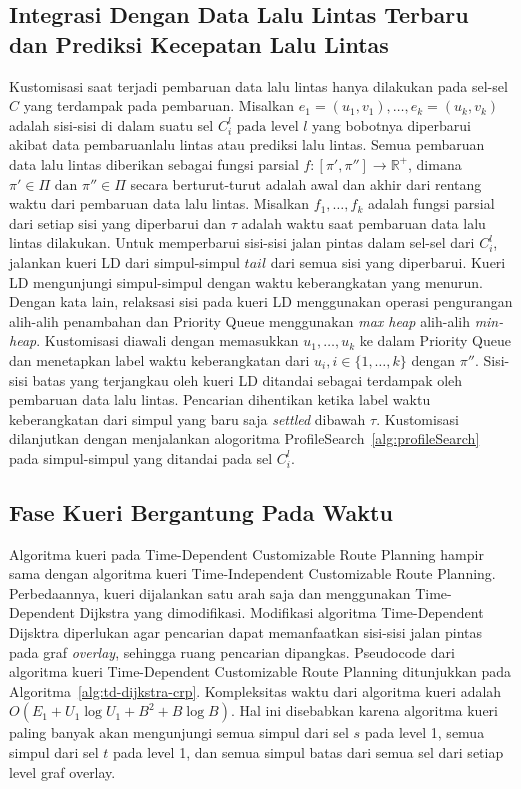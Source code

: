 \subsection{Integrasi Dengan Data Lalu Lintas Terbaru dan Prediksi Kecepatan Lalu Lintas}
\label{subsec:tdcrp-traffic-update}
Kustomisasi saat terjadi pembaruan data lalu lintas hanya dilakukan pada sel-sel $C$ yang terdampak pada pembaruan. Misalkan $e_1=(u_1,v_1),\ldots,e_k=(u_k,v_k)$ adalah sisi-sisi di dalam suatu sel $C_i^l \text{ pada level }l$ yang bobotnya diperbarui akibat data pembaruanlalu lintas atau prediksi lalu lintas. Semua pembaruan data lalu lintas diberikan sebagai fungsi parsial $f:[\pi',\pi'']\rightarrow \mathbb{R}^+$, dimana $\pi'\in \Pi \text{ dan }\pi''\in \Pi$ secara berturut-turut adalah awal dan akhir dari rentang waktu dari pembaruan data lalu lintas. Misalkan $f_1,\ldots,f_k$ adalah fungsi parsial dari setiap sisi yang diperbarui dan $\tau$ adalah waktu saat pembaruan data lalu lintas dilakukan.  Untuk memperbarui sisi-sisi jalan pintas dalam sel-sel dari $C_i^l$, jalankan kueri LD dari simpul-simpul $tail$ dari semua sisi yang diperbarui. Kueri LD mengunjungi simpul-simpul dengan waktu keberangkatan yang menurun. Dengan kata lain, relaksasi sisi pada kueri LD menggunakan operasi pengurangan alih-alih penambahan dan Priority Queue menggunakan \textit{max heap} alih-alih \textit{min-heap}. Kustomisasi diawali dengan memasukkan $u_1,\ldots,u_k$ ke dalam Priority Queue dan menetapkan label waktu keberangkatan dari $u_i,i\in\{1,\ldots,k\}$ dengan $\pi''$. Sisi-sisi batas yang terjangkau oleh kueri LD ditandai sebagai terdampak oleh pembaruan data lalu lintas. Pencarian dihentikan ketika label waktu keberangkatan dari simpul yang baru saja \textit{settled} dibawah $\tau$. Kustomisasi dilanjutkan dengan menjalankan alogoritma ProfileSearch~\ref{alg:profileSearch} pada simpul-simpul yang ditandai pada sel $C_i^l$.

\subsection{Fase Kueri Bergantung Pada Waktu}
\label{subsec:tdcrp-time-dependent-query}
Algoritma kueri pada Time-Dependent Customizable Route Planning hampir sama dengan algoritma kueri Time-Independent Customizable Route Planning. Perbedaannya, kueri dijalankan satu arah saja dan menggunakan Time-Dependent Dijkstra yang dimodifikasi. Modifikasi algoritma Time-Dependent Dijsktra diperlukan agar pencarian dapat memanfaatkan sisi-sisi jalan pintas pada graf \textit{overlay}, sehingga ruang pencarian dipangkas. Pseudocode dari algoritma kueri Time-Dependent Customizable Route Planning ditunjukkan pada Algoritma~\ref{alg:td-dijkstra-crp}. Kompleksitas waktu dari algoritma kueri adalah $O(E_1+U_1\log U_1+B^{2}+B \log B)$. Hal ini disebabkan karena algoritma kueri paling banyak akan mengunjungi semua simpul dari sel $s$ pada level 1, semua simpul dari sel $t$ pada level 1, dan semua simpul batas dari semua sel dari setiap level graf overlay. 



